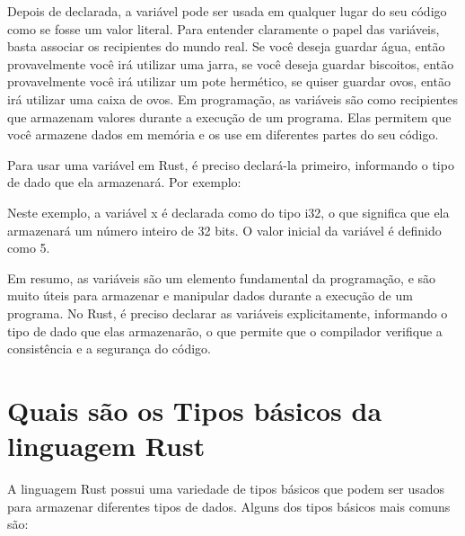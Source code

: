 \documentclass[12pt,a4paper,oneside]{abntex2}
\begin{document}
Depois de declarada, a variável pode ser usada em qualquer lugar do seu código como se fosse um valor literal. Para entender claramente o papel das variáveis, basta associar os recipientes do mundo real. Se você deseja guardar água, então provavelmente você irá utilizar uma jarra, se você deseja guardar biscoitos, então provavelmente você irá utilizar um pote hermético, se quiser guardar ovos, então irá utilizar uma caixa de ovos. 
Em programação, as variáveis são como recipientes que armazenam valores durante a execução de um programa. Elas permitem que você armazene dados em memória e os use em diferentes partes do seu código.

Para usar uma variável em Rust, é preciso declará-la primeiro, informando o tipo de dado que ela armazenará. Por exemplo:



Neste exemplo, a variável x é declarada como do tipo i32, o que significa que ela armazenará um número inteiro de 32 bits. O valor inicial da variável é definido como 5.




Em resumo, as variáveis são um elemento fundamental da programação, e são muito úteis para armazenar e manipular dados durante a execução de um programa. No Rust, é preciso declarar as variáveis explicitamente, informando o tipo de dado que elas armazenarão, o que permite que o compilador verifique a consistência e a segurança do código.

\section{Quais são os Tipos básicos da linguagem Rust}

A linguagem Rust possui uma variedade de tipos básicos que podem ser usados para armazenar diferentes tipos de dados. Alguns dos tipos básicos mais comuns são:
\end{document}
